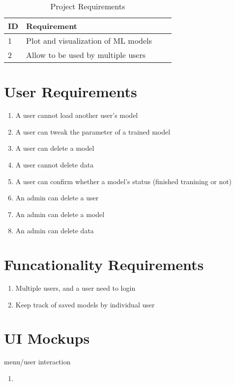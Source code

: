 \documentclass[11pt]{article}
\begin{document}
\begin{table}[htb]
 \small
 \centering
  \begin{tabular}{|l|l|l|l|}
  \hline
  \bf ID & Requirement\\ \hline
       1 & Plot and visualization of ML models\\
       2 & Allow to be used by multiple users \\
  \hline
  \end{tabular}
 \caption{Project Requirements} 
\end{table}



\section{User Requirements}
\begin{enumerate}[leftmargin=4\parindent,itemsep=-1ex]
 \item A user cannot load another user's model
 \item A user can tweak the parameter of a trained model
 \item A user can delete a model
 \item A user cannot delete data
 \item A user can confirm whether a model's status (finished tranining or not)
 \item An admin can delete a user
 \item An admin can delete a model
 \item An admin can delete data
\end{enumerate}

\section{Funcationality Requirements}
\begin{enumerate}[leftmargin=4\parindent,itemsep=-1ex]
 \item Multiple users, and a user need to login
 \item Keep track of saved models by individual user
\end{enumerate}

\section{UI Mockups}
menu/user interaction
\begin{enumerate}[leftmargin=4\parindent,itemsep=-1ex]
 \item 
\end{enumerate}
\end{document}
